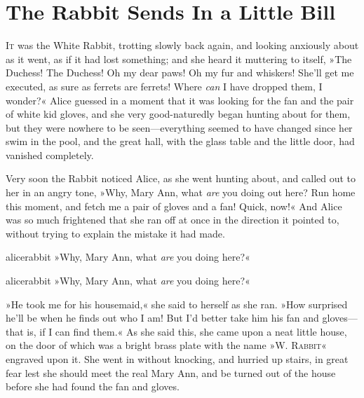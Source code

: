 \chapter{The Rabbit Sends In a Little Bill}

\lettrine[lines=4,findent=2pt]{I}{t} was the White Rabbit, trotting slowly back again, and looking anxiously about as it went, as if it had lost something; and she heard it muttering to itself, »The Duchess! The Duchess! Oh my dear paws! Oh my fur and whiskers! She'll get me executed, as sure as ferrets are ferrets! Where \textit{can} I have dropped them, I wonder?« Alice guessed in a moment that it was looking for the fan and the pair of white kid gloves, and she very good-naturedly began hunting about for them, but they were nowhere to be seen—everything seemed to have changed since her swim in the pool, and the great hall, with the glass table and the little door, had vanished completely.

Very soon the Rabbit noticed Alice, as she went hunting about, and called out to her in an angry tone, »Why, Mary Ann, what \textit{are} you doing out here? Run home this moment, and fetch me a pair of gloves and a fan! Quick, now!« And Alice was so much frightened that she ran off at once in the direction it pointed to, without trying to explain the mistake it had made.


\begin{pictures}
	\begin{letter}
		\begin{colorbigpic}
			[1.1]
			{alicerabbit}
			{»Why, Mary Ann, what \textit{are} you doing here?«}
			\end{colorbigpic}
	\end{letter}
	
	\begin{a4}
		\begin{colorbigpic}
			[1.0]
			{alicerabbit}
			{»Why, Mary Ann, what \textit{are} you doing here?«}
		\end{colorbigpic}
	\end{a4}	
\end{pictures}


»He took me for his housemaid,« she said to herself as she ran. »How surprised he'll be when he finds out who I am! But I'd better take him his fan and gloves—that is, if I can find them.« As she said this, she came upon a neat little house, on the door of which was a bright brass plate with the name »\textsc{W. Rabbit}« engraved upon it. She went in without knocking, and hurried up stairs, in great fear lest she should meet the real Mary Ann, and be turned out of the house before she had found the fan and gloves.

